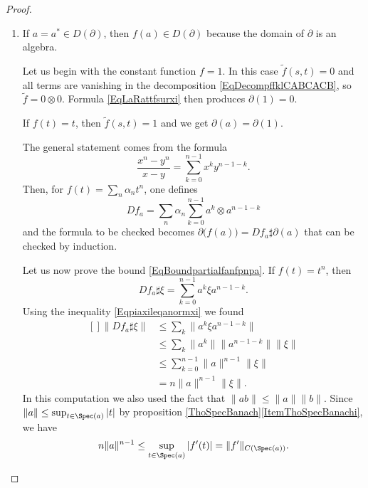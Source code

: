 \begin{proof}
    \begin{enumerate}
        \item
            If \(a=a^*\in D(\partial)\), then \(f(a)\in D(\partial)\) because the domain of \(\partial\) is an algebra.

            Let us begin with the constant function \(f=1\). In this case \(\tilde f(s,t)=0\) and all terms are vanishing in the decomposition \eqref{EqDecompffklCABCACB}, so \(\tilde f=0\otimes 0\). Formula \eqref{EqLaRattfsurxi} then produces \(\partial(1)=0\).

            If \(f(t)=t\), then \(\tilde f(s,t)=1\) and we get \(\partial(a)=\partial(1)\). 

            The general statement comes from the formula
            \begin{equation}
                \frac{ x^n-y^n }{ x-y }=\sum_{k=0}^{n-1} x^ky^{n-1-k}.
            \end{equation}
            Then, for \(f(t)=\sum_n\alpha_n t^n\), one defines
            \begin{equation}
                Df_a=\sum_n \alpha_n\sum_{k=0}^{n-1}  a^k\otimes a^{n-1-k}
            \end{equation}
            and the formula to be checked becomes \(\partial\big( f(a) \big)=Df_a\sharp\partial(a)\) that can be checked by induction.

            Let us now prove the bound \eqref{EqBoundpartialfanfpnpa}. If \(f(t)=t^n\), then
            \begin{equation}
                Df_a\sharp\xi=\sum_{k=0}^{n-1}a^k\xi a^{n-1-k}.
            \end{equation}
            Using the inequality \eqref{Eqpiaxileqanormxi} we found
            \begin{equation}
                \begin{aligned}[]
                    \| Df_a\sharp\xi \| &\leq\sum_k\| a^k\xi a^{n-1-k} \|\\
                    &\leq\sum_k \| a^k \|\| a^{n-1-k} \|\| \xi \|\\
                    &\leq\sum_{k=0}^{n-1}\| a \|^{n-1}\| \xi \|\\
                    &=n\| a \|^{n-1}\| \xi \|.
                \end{aligned}
            \end{equation}
            In this computation we also used the fact that \(  \| ab \|\leq \| a \|\| b \|\). Since \(\| a \|\leq\sup_{t\in\Spec(a)}| t |\) by proposition \ref{ThoSpecBanach}\ref{ItemThoSpecBanachi}, we have
            \begin{equation}
                n\| a \|^{n-1}\leq\sup_{t\in\Spec(a)}| f'(t) |=\| f' \|_{C( \Spec(a) )}.
            \end{equation}
            

\end{enumerate}
\end{proof}
